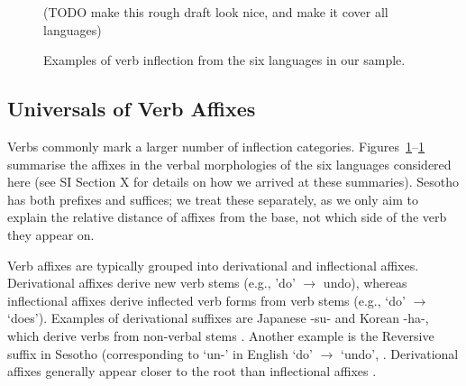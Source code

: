 \documentclass[11pt,letterpaper]{article}
\newcommand{\citep}{\parencite}
\newcommand\mhahn[1]{{\color{red}(#1)}}
\begin{document}
\begin{figure}
\mhahn{TODO make this rough draft look nice, and make it cover all languages}
\caption{Examples of verb inflection from the six languages in our sample.}\label{tab:examples-verbs}
\end{figure}
 
 


\subsection{Universals of Verb Affixes}\label{sec:univ-verbs}
Verbs commonly mark a larger number of inflection categories.
Figures~\ref{tab:examples-verbs}--\ref{tab:examples-verbs} summarise the affixes in the verbal morphologies of the six languages considered here (see SI Section X for details on how we arrived at these summaries).
Sesotho has both prefixes and suffices; we treat these separately, as we only aim to explain the relative distance of affixes from the base, not which side of the verb they appear on.

Verb affixes are typically grouped into derivational and inflectional affixes.
Derivational affixes derive new verb stems (e.g., 'do' $\rightarrow$ undo), whereas inflectional affixes derive inflected verb forms from verb stems (e.g., `do' $\rightarrow$ `does').
Examples of derivational suffixes are Japanese -su- and Korean -ha-, which derive verbs from non-verbal stems \citep{hasegawa2014japanese, yeon2010korean}.
Another example is the Reversive suffix in Sesotho (corresponding to `un-' in English `do' $\rightarrow$ `undo', \citep{doke1967textbook}.
Derivational affixes generally appear closer to the root than inflectional affixes \citep{greenberg-universals-1963}.
\end{document}

